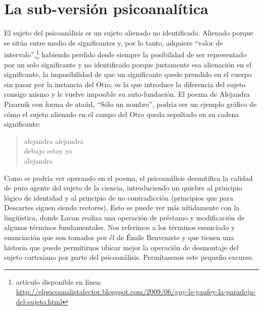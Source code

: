 \section{La sub-versión psicoanalítica}


El sujeto del psicoanálisis es un sujeto alienado no identificado. Alienado porque se sitúa entre medio de significantes y, por lo tanto, adquiere \enquote{valor de intervalo},\footnote{\cite[][]{@7120-LEGAUFEY2009} artículo disponible en línea: \url{http://elpsicoanalistalector.blogspot.com/2009/06/guy-le-gaufey-la-paradoja-del-sujeto.html}} habiendo perdido desde siempre la posibilidad de ser representado por un solo significante y no identificado porque justamente esa alienación en el significante, la imposibilidad de que un significante quede prendido en el cuerpo sin pasar por la instancia del Otro, es la que introduce la diferencia del sujeto consigo mismo y le vuelve imposible su auto-fundación. El poema de Alejandra Pizarnik con forma de ataúd, \enquote{Sólo un nombre}, podría ser un ejemplo gráfico de cómo el sujeto alienado en el campo del Otro queda sepultado en su cadena significante:

\begin{verse}
alejandra alejandra \\debajo estoy yo\\alejandra
\end{verse}

Como se podría ver operando en el poema, el psicoanálisis desmitifica la calidad de puro agente del sujeto de la ciencia, introduciendo un quiebre al principio lógico de identidad y al principio de no contradicción (principios que para Descartes siguen siendo rectores). Esto se puede ver más nítidamente con la lingüística, donde Lacan realiza una operación de préstamo y modificación de algunos términos fundamentales. Nos referimos a los términos enunciado y enunciación que son tomados por él de Émile Benveniste y que tienen una historia que puede permitirnos ubicar mejor la operación de desmontaje del sujeto cartesiano por parte del psicoanálisis. Permítasenos este pequeño excurso.

